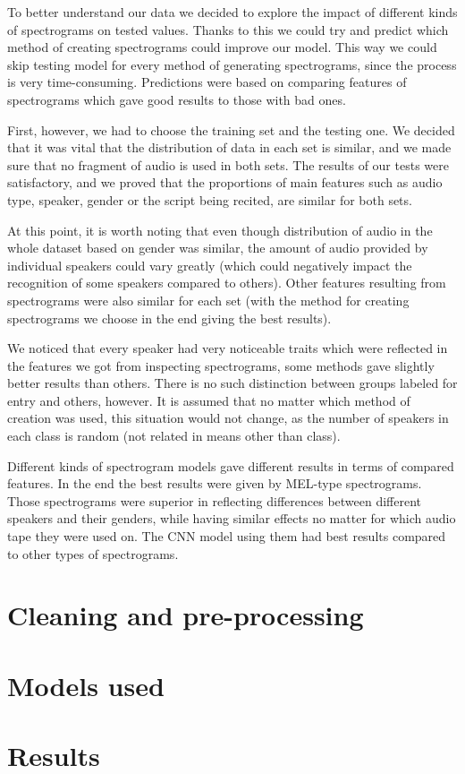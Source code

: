 \documentclass[11pt, letterpaper]{article}
\begin{document}
To better understand our data we decided to explore the impact of different kinds of spectrograms on tested values. Thanks to this we could try and predict which method of creating spectrograms could improve our model. This way we could skip testing model for every method of generating spectrograms, since the process is very time-consuming. Predictions were based on comparing features of spectrograms which gave good results to those with bad ones. 

First, however, we had to choose the training set and the testing one. We decided that it was vital that the distribution of data in each set is similar, and we made sure that no fragment of audio is used in both sets.  The results of our tests were satisfactory, and we proved that the proportions of main features such as audio type, speaker, gender or the script being recited, are similar for both sets.

At this point, it is worth noting that even though distribution of audio in the whole dataset based on gender was similar, the amount of audio provided by individual speakers could vary greatly (which could negatively impact the recognition of some speakers compared to others). Other features resulting from spectrograms were also similar for each set (with the method for creating spectrograms we choose in the end giving the best results). 

We noticed that every speaker had very noticeable traits which were reflected in the features we got from inspecting spectrograms, some methods gave slightly better results than others. There is no such distinction between groups labeled for entry and others, however. It is assumed that no matter which method of creation was used, this situation would not change, as the number of speakers in each class is random (not related in means other than class).

Different kinds of spectrogram models gave different results in terms of compared features. In the end the best results were given by MEL-type spectrograms. Those spectrograms were superior in reflecting differences between different speakers and their genders, while having similar effects no matter for which audio tape they were used on. The CNN model using them had best results compared to other types of spectrograms.

\section{Cleaning and pre-processing}
\section{Models used}
\section{Results}
\end{document}
